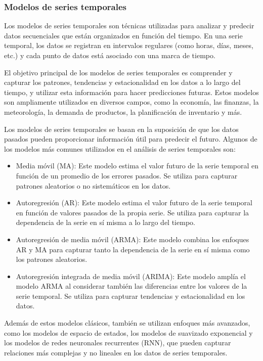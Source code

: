 \subsubsection{Modelos de series temporales}
Los modelos de series temporales son técnicas utilizadas para analizar y predecir datos secuenciales que están organizados en función del tiempo. En una serie temporal, los datos se registran en intervalos regulares (como horas, días, meses, etc.) y cada punto de datos está asociado con una marca de tiempo.

El objetivo principal de los modelos de series temporales es comprender y capturar los patrones, tendencias y estacionalidad en los datos a lo largo del tiempo, y utilizar esta información para hacer predicciones futuras. Estos modelos son ampliamente utilizados en diversos campos, como la economía, las finanzas, la meteorología, la demanda de productos, la planificación de inventario y más.

Los modelos de series temporales se basan en la suposición de que los datos pasados pueden proporcionar información útil para predecir el futuro. Algunos de los modelos más comunes utilizados en el análisis de series temporales son:
\begin{itemize}
    \item Media móvil (MA): Este modelo estima el valor futuro de la serie temporal en función de un promedio de los errores pasados. Se utiliza para capturar patrones aleatorios o no sistemáticos en los datos.
    \item Autoregresión (AR): Este modelo estima el valor futuro de la serie temporal en función de valores pasados de la propia serie. Se utiliza para capturar la dependencia de la serie en sí misma a lo largo del tiempo.
    \item Autoregresión de media móvil (ARMA): Este modelo combina los enfoques AR y MA para capturar tanto la dependencia de la serie en sí misma como los patrones aleatorios.
    \item Autoregresión integrada de media móvil (ARIMA): Este modelo amplía el modelo ARMA al considerar también las diferencias entre los valores de la serie temporal. Se utiliza para capturar tendencias y estacionalidad en los datos.
\end{itemize}

Además de estos modelos clásicos, también se utilizan enfoques más avanzados, como los modelos de espacio de estados, los modelos de suavizado exponencial y los modelos de redes neuronales recurrentes (RNN), que pueden capturar relaciones más complejas y no lineales en los datos de series temporales.

